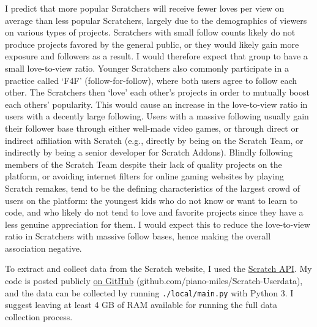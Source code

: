 \documentclass[12pt]{article}
\begin{document}
\begin{flushleft}
	I predict that more popular Scratchers will receive fewer loves per view on average than less popular Scratchers, largely due to the demographics of viewers on various types of projects. Scratchers with small follow counts likely do not produce projects favored by the general public, or they would likely gain more exposure and followers as a result. I would therefore expect that group to have a small love-to-view ratio. Younger Scratchers also commonly participate in a practice called ‘F4F’ (follow-for-follow), where both users agree to follow each other. The Scratchers then ‘love’ each other’s projects in order to mutually boost each others’ popularity. This would cause an increase in the love-to-view ratio in users with a decently large following. Users with a massive following usually gain their follower base through either well-made video games, or through direct or indirect affiliation with Scratch (e.g., directly by being on the Scratch Team, or indirectly by being a senior developer for Scratch Addons). Blindly following members of the Scratch Team despite their lack of quality projects on the platform, or avoiding internet filters for online gaming websites by playing Scratch remakes, tend to be the defining characteristics of the largest crowd of users on the platform: the youngest kids who do not know or want to learn to code, and who likely do not tend to love and favorite projects since they have a less genuine appreciation for them. I would expect this to reduce the love-to-view ratio in Scratchers with massive follow bases, hence making the overall association negative.
	
	To extract and collect data from the Scratch website, I used the \hyperlink{https://api.scratch.mit.edu/}{Scratch API}. My code is posted publicly \hyperlink{https://github.com/piano-miles/Scratch-Userdata}{on GitHub} (github.com/piano-miles/Scratch-Userdata), and the data can be collected by running \texttt{./local/main.py} with Python 3. I suggest leaving at least 4 GB of RAM available for running the full data collection process.
	


\end{flushleft}
\end{document}
